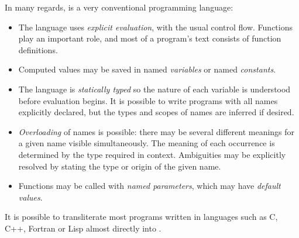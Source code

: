 

In many regards, \asharp{} is a very conventional programming language:
\begin{itemize}
\item
  The language uses {\em explicit evaluation}, with the usual control flow.
  Functions play an important role,
  and most of a program's text consists of function definitions.  
\item
  Computed values may be saved in named {\em variables}
  or named {\em constants}. 
\item
  The language is {\em statically typed} so the nature of each variable
  is understood before evaluation begins.
  It is possible to write programs with all names explicitly
  declared, but the types and scopes of names are inferred if desired.
\item
  {\em Overloading} of names is possible: there
  may be several different meanings for a given name visible simultaneously.  
  The meaning of each occurrence is determined by the type required in context.
  Ambiguities may be explicitly resolved by stating the type or origin of
  the given name.
\item
  Functions may be called with {\em named parameters}, which may have
  {\em default values}.
\end{itemize}
It is possible to transliterate most programs written
in languages such as C, C++, Fortran or Lisp almost
directly into \asharp{}.


